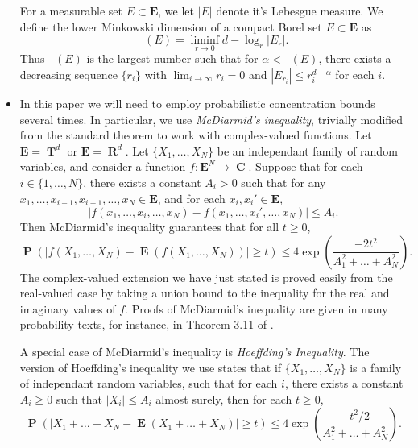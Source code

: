 \documentclass[12pt,reqno]{article}
\numberwithin{equation}{section}
\DeclareMathOperator{\lowminkdim}{\underline{\dim}_{\mathbf{M}}}
\DeclareMathOperator{\RR}{\mathbf{R}}
\DeclareMathOperator{\TT}{\mathbf{T}}
\DeclareMathOperator{\CC}{\mathbf{C}}
\numberwithin{theorem}{section}
\DeclareMathOperator{\EE}{\mathbf{E}}
\DeclareMathOperator{\PP}{\mathbf{P}}
\begin{document}
\begin{itemize}
    For a measurable set $E \subset \mathbf{E}$, we let $|E|$ denote it's Lebesgue measure. We define the lower Minkowski dimension of a compact Borel set $E \subset \mathbf{E}$ as
    \[ \lowminkdim(E) = \liminf_{r \to 0} d - \log_r|E_r|. \]
    Thus $\lowminkdim(E)$ is the largest number such that for $\alpha < \lowminkdim(E)$, there exists a decreasing sequence $\{ r_i \}$ with $\lim_{i \to \infty} r_i = 0$ and $|E_{r_i}| \leq r_i^{d - \alpha}$ for each $i$.

    \item In this paper we will need to employ probabilistic concentration bounds several times. In particular, we use \emph{McDiarmid's inequality}, trivially modified from the standard theorem to work with complex-valued functions. Let $\mathbf{E} = \TT^d$ or $\mathbf{E} = \RR^d$. Let $\{ X_1, \dots, X_N \}$ be an independant family of random variables, and consider a function $f: \mathbf{E}^N \to \CC$. Suppose that for each $i \in \{ 1, \dots, N \}$, there exists a constant $A_i > 0$ such that for any $x_1, \dots, x_{i-1}, x_{i+1}, \dots, x_N \in \mathbf{E}$, and for each $x_i, x_i' \in \mathbf{E}$,
    \[ |f(x_1, \dots, x_i, \dots, x_N) - f(x_1, \dots, x_i', \dots, x_N)| \leq A_i. \]
    Then McDiarmid's inequality guarantees that for all $t \geq 0$,
    \[ \PP \left( |f(X_1, \dots, X_N) - \EE(f(X_1, \dots, X_N))| \geq t \right) \leq 4 \exp \left( \frac{-2t^2}{A_1^2 + \dots + A_N^2} \right). \]
    The complex-valued extension we have just stated is proved easily from the real-valued case by taking a union bound to the inequality for the real and imaginary values of $f$. Proofs of McDiarmid's inequality are given in many probability texts, for instance, in Theorem 3.11 of \cite{VanHandel}.

    A special case of McDiarmid's inequality is \emph{Hoeffding's Inequality}. The version of Hoeffding's inequality we use states that if $\{ X_1, \dots, X_N \}$ is a family of independant random variables, such that for each $i$, there exists a constant $A_i \geq 0$ such that $|X_i| \leq A_i$ almost surely, then for each $t \geq 0$,
    \[ \PP \left( |X_1 + \dots + X_N - \EE(X_1 + \dots + X_N)| \geq t \right) \leq 4 \exp \left(\frac{-t^2/2}{A_1^2 + \dots + A_N^2} \right). \]

    \begin{comment}


\end{comment}
\end{itemize}
\end{document}
